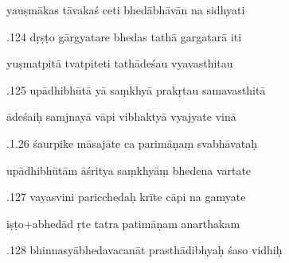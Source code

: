 \documentclass[article,12pt,a4paper]{memoir}%
\newcounter{parCount}
\begin{document}
	  
	  \pstart \leavevmode%
	yauṣmākas tāvakaś ceti bhedābhāvān na sidhyati 
	{}
	\pend%
      

	  
	  \pstart {}.124 dṛṣṭo gārgyatare bhedas tathā gargatarā iti 
	{}
	\pend%
      

	  
	  \pstart \leavevmode%
	yuṣmatpitā tvatpiteti tathādeśau vyavasthitau 
	{}
	\pend%
      

	  
	  \pstart {}.125 upādhibhūtā yā saṃkhyā prakṛtau samavasthitā 
	{}
	\pend%
      

	  
	  \pstart \leavevmode%
	ādeśaiḥ samjnayā vāpi vibhaktyā vyajyate vinā 
	{}
	\pend%
      

	  
	  \pstart {}.1.26 śaurpike māsajāte ca parimāṇaṃ svabhāvataḥ 
	{}
	\pend%
      

	  
	  \pstart \leavevmode%
	upādhibhūtām āśritya saṃkhyāṃ bhedena vartate 
	{}
	\pend%
      

	  
	  \pstart {}.127 vayasvini paricchedaḥ krīte cāpi na gamyate 
	{}
	\pend%
      

	  
	  \pstart \leavevmode%
	iṣṭo+abhedād ṛte tatra patimāṇam anarthakam 
	{}
	\pend%
      

	  
	  \pstart {}.128 bhinnasyābhedavacanāt prasthādibhyaḥ śaso vidhiḥ 
	{}
	\pend%
      
\end{document}
